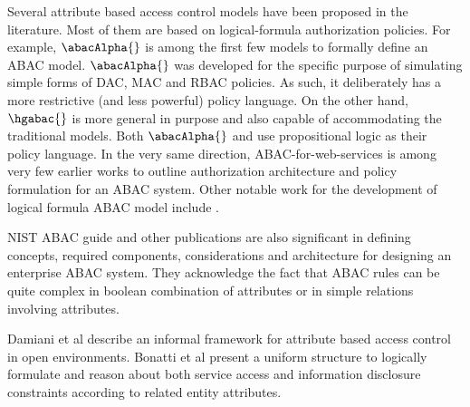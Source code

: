 
	Several attribute based access control models have been proposed in the literature. Most of them are based on logical-formula authorization policies. For example,	$\abacAlpha{}$ \cite{abacAlpha} is among the first few models to formally define an ABAC model.  $\abacAlpha{}$ was developed  for the specific purpose of simulating simple forms of DAC, MAC and RBAC policies. As such, it deliberately has a more restrictive (and less powerful) policy language.  On the other hand, $\hgabac{}$ \cite{hgabac} is more general in purpose and also capable of accommodating  the traditional models. Both $\abacAlpha{}$ and \hgabac{} use propositional logic as their policy language. In the very same direction, ABAC-for-web-services \cite{abac-for-web-service} is among very few earlier works to outline authorization architecture and policy formulation for an ABAC system. Other notable work for the development of logical formula ABAC model include \cite{grid-abac,ontologies,abac-ws,wang2004logic}.
	
    NIST ABAC guide \cite{nist-abac-draft} and other publications \cite{hu2015attribute}  are also significant in defining concepts, required components, considerations and architecture for designing an  enterprise ABAC system. They acknowledge the fact that ABAC rules can be quite complex in boolean combination of attributes or in simple relations involving attributes.    
    
    
	
	Damiani et al \cite{damiani2005} describe an informal framework for 	attribute based access control in open environments. Bonatti et al \cite{bonatti,bonatti2} present a uniform structure to logically formulate and reason about both service access and information disclosure constraints according to related entity attributes. 	
	
